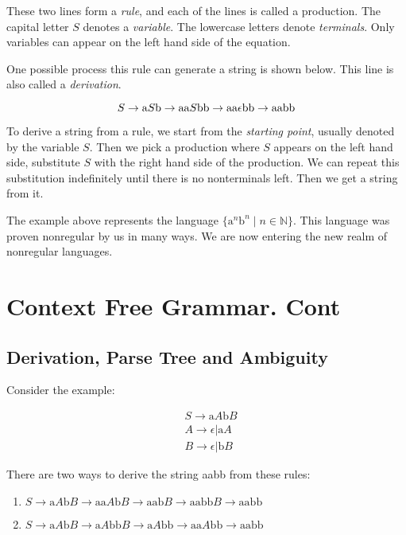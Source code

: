 \documentclass[11pt]{article}
\begin{document}
These two lines form a \emph{rule}, and each of the lines is called a
production. The capital letter $S$ denotes a \emph{variable}. The lowercase
letters denote \emph{terminals}. Only variables can appear on the left hand
side of the equation.

One possible process this rule can generate a string is shown below. This
line is also called a \emph{derivation}.

\begin{equation*}
\centering
S \rightarrow \mathrm{a}S\mathrm{b} \rightarrow \mathrm{aa}S\mathrm{bb} \rightarrow
\mathrm{aa} \epsilon \mathrm{bb} \rightarrow \mathrm{aabb}
\end{equation*}

To derive a string from a rule, we start from the \emph{starting point},
usually denoted by the variable $S$. Then we pick a production where $S$ appears
on the left hand side, substitute $S$ with the right hand side of the
production. We can repeat this substitution indefinitely until there is no
nonterminals left. Then we get a string from it.

The example above represents the language $\{\mathrm{a}^n\mathrm{b}^n \mid n \in \mathbb{N}\}$.
This language was proven nonregular by us in many ways. We are now entering
the new realm of nonregular languages.

\section{Context Free Grammar. Cont}

\subsection{Derivation, Parse Tree and Ambiguity}

Consider the example:

\begin{align*}
&S \rightarrow \mathrm{a}A\mathrm{b}B \\
&A \rightarrow \epsilon | \mathrm{a}A \\
&B \rightarrow \epsilon | \mathrm{b}B
\end{align*}

There are two ways to derive the string aabb from these rules:

\begin{enumerate}
\item $S \rightarrow \mathrm{a}A\mathrm{b}B \rightarrow \mathrm{aa}A\mathrm{b}B \rightarrow \mathrm{aab}B \rightarrow \mathrm{aabb}B \rightarrow \mathrm{aabb}$
\item $S \rightarrow \mathrm{a}A\mathrm{b}B \rightarrow \mathrm{a}A\mathrm{b}\mathrm{b}B \rightarrow \mathrm{a}A\mathrm{bb} \rightarrow \mathrm{aa}A\mathrm{bb} \rightarrow \mathrm{aabb}$
\end{enumerate}
\end{document}
